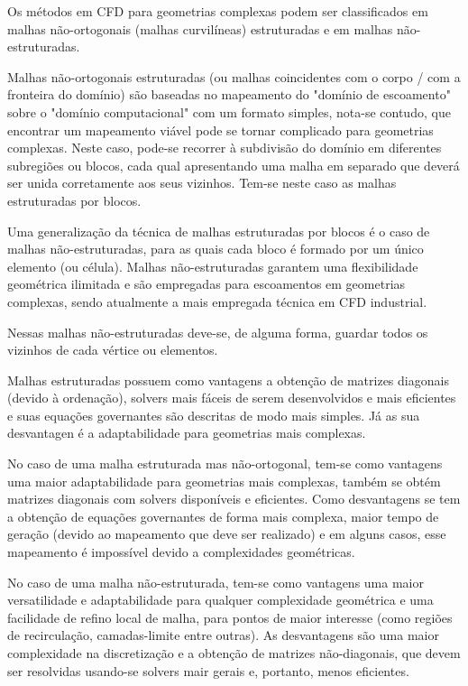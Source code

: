 Os métodos em CFD para geometrias complexas podem ser classificados em malhas não-ortogonais (malhas curvilíneas) estruturadas e em malhas não-estruturadas.

Malhas não-ortogonais estruturadas (ou malhas coincidentes com o corpo / com a fronteira do domínio) são baseadas no mapeamento do "domínio de escoamento" sobre o "domínio computacional" com um formato simples, nota-se contudo, que encontrar um mapeamento viável pode se tornar complicado para geometrias complexas. Neste caso, pode-se recorrer à subdivisão do domínio em diferentes subregiões ou blocos, cada qual apresentando uma malha em separado que deverá ser unida corretamente aos seus vizinhos. Tem-se neste caso as malhas estruturadas por blocos.

Uma generalização da técnica de malhas estruturadas por blocos é o caso de malhas não-estruturadas, para as quais cada bloco é formado por um único elemento (ou célula). Malhas não-estruturadas garantem uma flexibilidade geométrica ilimitada e são empregadas para escoamentos em geometrias complexas, sendo atualmente a mais empregada técnica em CFD industrial.

Nessas malhas não-estruturadas deve-se, de alguma forma, guardar todos os vizinhos de cada vértice ou elementos. \cite{Shewchuk1992}

Malhas estruturadas possuem como vantagens a obtenção de matrizes diagonais (devido à ordenação), solvers mais fáceis de serem desenvolvidos e mais eficientes e suas equações governantes são descritas de modo mais simples. Já as sua desvantagen é a adaptabilidade para geometrias mais complexas.

No caso de uma malha estruturada mas não-ortogonal, tem-se como vantagens uma maior adaptabilidade para geometrias mais complexas, também se obtém matrizes diagonais com solvers disponíveis e eficientes. Como desvantagens se tem a obtenção de equações governantes de forma mais complexa, maior tempo de geração (devido ao mapeamento que deve ser realizado) e em alguns casos, esse mapeamento é impossível devido a complexidades geométricas.

No caso de uma malha não-estruturada, tem-se como vantagens uma maior versatilidade e adaptabilidade para qualquer complexidade geométrica e uma facilidade de refino local de malha, para pontos de maior interesse (como regiões de recirculação, camadas-limite entre outras). As desvantagens são uma maior complexidade na discretização e a obtenção de matrizes não-diagonais, que devem ser resolvidas usando-se solvers mair gerais e, portanto, menos eficientes.

